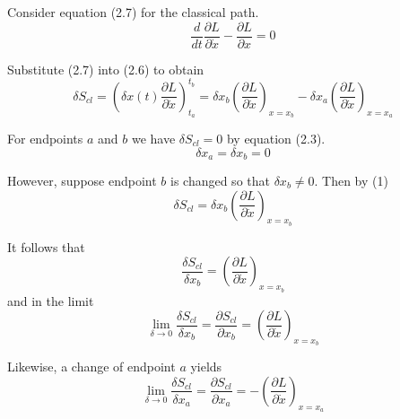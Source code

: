 


Consider equation (2.7) for the classical path.
\begin{equation*}
\frac{d}{dt}\frac{\partial L}{\partial\dot x}
-\frac{\partial L}{\partial x}=0
\tag{2.7}
\end{equation*}

Substitute (2.7) into (2.6) to obtain
\begin{equation*}
\delta S_{cl}=\left(\delta x(t)\frac{\partial L}{\partial\dot x}\right)_{t_a}^{t_b}
=\delta x_b\left(\frac{\partial L}{\partial\dot x}\right)_{x=x_b}
-\delta x_a\left(\frac{\partial L}{\partial\dot x}\right)_{x=x_a}
\tag{1}
\end{equation*}

For endpoints $a$ and $b$ we have $\delta S_{cl}=0$ by equation (2.3).
\begin{equation*}
\delta x_a=\delta x_b=0
\tag{2.3}
\end{equation*}

However, suppose endpoint $b$ is changed so that $\delta x_b\ne0$.
Then by (1)
\begin{equation*}
\delta S_{cl}=\delta x_b\left(\frac{\partial L}{\partial\dot x}\right)_{x=x_b}
\end{equation*}

It follows that
\begin{equation*}
\frac{\delta S_{cl}}{\delta x_b}
=\left(\frac{\partial L}{\partial\dot x}\right)_{x=x_b}
\end{equation*}
and in the limit
\begin{equation*}
\lim_{\delta\rightarrow0}\frac{\delta S_{cl}}{\delta x_b}=\frac{\partial S_{cl}}{\partial x_b}
=\left(\frac{\partial L}{\partial\dot x}\right)_{x=x_b}
\end{equation*}

Likewise, a change of endpoint $a$ yields
\begin{equation*}
\lim_{\delta\rightarrow0}\frac{\delta S_{cl}}{\delta x_a}=\frac{\partial S_{cl}}{\partial x_a}
=-\left(\frac{\partial L}{\partial\dot x}\right)_{x=x_a}
\end{equation*}


